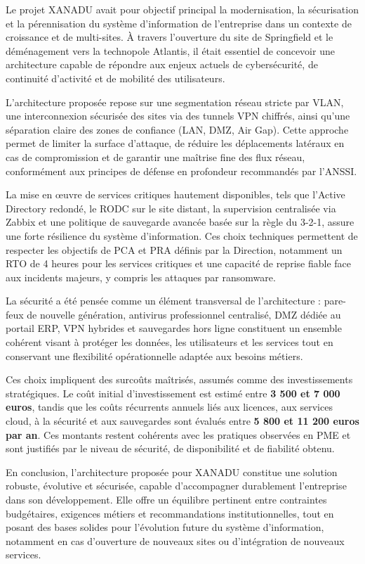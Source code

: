 Le projet XANADU avait pour objectif principal la modernisation, la sécurisation et la pérennisation du système d’information de l’entreprise dans un contexte de croissance et de multi-sites. À travers l’ouverture du site de Springfield et le déménagement vers la technopole Atlantis, il était essentiel de concevoir une architecture capable de répondre aux enjeux actuels de cybersécurité, de continuité d’activité et de mobilité des utilisateurs.

\noindent L’architecture proposée repose sur une segmentation réseau stricte par VLAN, une interconnexion sécurisée des sites via des tunnels VPN chiffrés, ainsi qu’une séparation claire des zones de confiance (LAN, DMZ, Air Gap). Cette approche permet de limiter la surface d’attaque, de réduire les déplacements latéraux en cas de compromission et de garantir une maîtrise fine des flux réseau, conformément aux principes de défense en profondeur recommandés par l’ANSSI.

\noindent La mise en œuvre de services critiques hautement disponibles, tels que l’Active Directory redondé, le RODC sur le site distant, la supervision centralisée via Zabbix et une politique de sauvegarde avancée basée sur la règle du 3-2-1, assure une forte résilience du système d’information. Ces choix techniques permettent de respecter les objectifs de PCA et PRA définis par la Direction, notamment un RTO de 4 heures pour les services critiques et une capacité de reprise fiable face aux incidents majeurs, y compris les attaques par ransomware.

\noindent La sécurité a été pensée comme un élément transversal de l’architecture : pare-feux de nouvelle génération, antivirus professionnel centralisé, DMZ dédiée au portail ERP, VPN hybrides et sauvegardes hors ligne constituent un ensemble cohérent visant à protéger les données, les utilisateurs et les services tout en conservant une flexibilité opérationnelle adaptée aux besoins métiers.

\noindent Ces choix impliquent des surcoûts maîtrisés, assumés comme des investissements stratégiques. Le coût initial d’investissement est estimé entre \textbf{3 500 et 7 000 euros}, tandis que les coûts récurrents annuels liés aux licences, aux services cloud, à la sécurité et aux sauvegardes sont évalués entre \textbf{5 800 et 11 200 euros par an}. Ces montants restent cohérents avec les pratiques observées en PME et sont justifiés par le niveau de sécurité, de disponibilité et de fiabilité obtenu.

\noindent En conclusion, l’architecture proposée pour XANADU constitue une solution robuste, évolutive et sécurisée, capable d’accompagner durablement l’entreprise dans son développement. Elle offre un équilibre pertinent entre contraintes budgétaires, exigences métiers et recommandations institutionnelles, tout en posant des bases solides pour l’évolution future du système d’information, notamment en cas d’ouverture de nouveaux sites ou d’intégration de nouveaux services.


